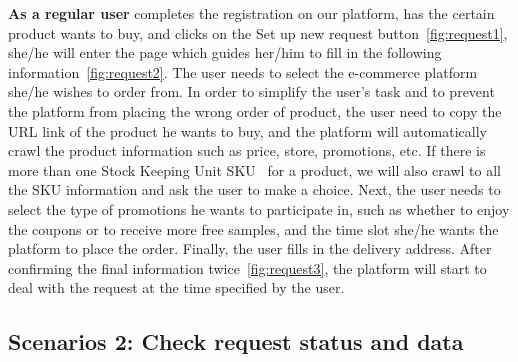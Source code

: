\textbf{As a regular user} completes the registration on our platform, has the certain product wants to buy, and clicks on the Set up new request button~\ref{fig:request1}, she/he will enter the page which guides her/him to fill in the following information~\ref{fig:request2}. The user needs to select the e-commerce platform she/he wishes to order from. In order to simplify the user's task and to prevent the platform from placing the wrong order of product, the user need to copy the URL link of the product he wants to buy, and the platform will automatically crawl the product information such as price, store, promotions, etc. If there is more than one Stock Keeping Unit SKU~\cite{SKU} for a product, we will also crawl to all the SKU information and ask the user to make a choice. Next, the user needs to select the type of promotions he wants to participate in, such as whether to enjoy the coupons or to receive more free samples, and the time slot she/he wants the platform to place the order. Finally, the user fills in the delivery address. After confirming the final information twice~\ref{fig:request3}, the platform will start to deal with the request at the time specified by the user.

\subsection{Scenarios 2: Check request status and data}

